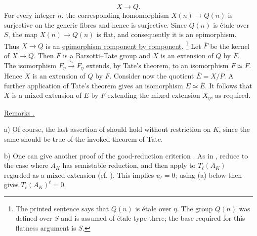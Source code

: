 \begin{equation*}
X\longrightarrow Q.
\end{equation*}
For every integer $n$, the corresponding homomorphism
$X(n)\longrightarrow Q(n)$ is surjective on the generic fibres and hence is
surjective. Since $Q(n)$ is étale over $S$, the map
$X(n)\longrightarrow Q(n)$ is flat, and consequently it is an epimorphism.
Thus $X\longrightarrow Q$ is an \underline{epimorphism component by component}.
\footnote{The printed sentence says that $Q(n)$ is étale over $\eta$.
The group $Q(n)$ was defined over $S$ and is assumed of étale type there;
the base required for this flatness argument is $S$.}
Let $\overline F$ be the kernel of $X\longrightarrow Q$. Then
$\overline F$ is a Barsotti--Tate group and $X$ is an extension of $Q$ by
$\overline F$. The isomorphism
$F_\eta\xrightarrow{\sim}\overline F_\eta$ extends, by Tate's theorem, to
an isomorphism $F\simeq\overline F$. Hence $X$ is an extension of $Q$ by
$F$. Consider now the quotient $\overline E=X/P$. A further application of
Tate's theorem gives an isomorphism $E\simeq\overline E$. It follows that
$X$ is a mixed extension of $E$ by $F$ extending the mixed extension
$X_\eta$, as required.

\medskip
\noindent
\underline{Remarks .}

\smallskip
\noindent
a) Of course, the last assertion of  should hold without restriction
on $K$, since the same should be true of the invoked theorem of Tate.

\smallskip
\noindent
b) One can give another proof of the good-reduction criterion . As in
, reduce to the case where $A_K$ has semistable reduction, and then
apply  to $T_\ell(A_K)$ regarded as a mixed extension (cf. ). This
implies $u_\ell=0$; using (a) below then gives
$T_\ell(A_K)^t=0$.

